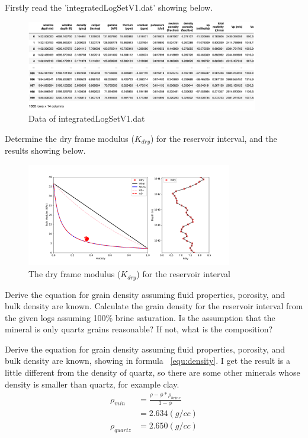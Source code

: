 \begin{solution}

    Firstly read the 'integratedLogSetV1.dat' showing below.
    \begin{figure}[H]
        \centering
        \includegraphics[width=0.9\textwidth]{figures/homework-1/p2-problem-0.jpg}
        \caption{Data of integratedLogSetV1.dat}
        \label{fig:logdata}
    \end{figure}
    Determine the dry frame modulus ($K_{dry}$) for the reservoir interval, and the results showing below.
    \begin{figure}[H]
        \centering
        \includegraphics[width=0.8\textwidth]{figures/homework-1/p2-problem-1.pdf}
        \caption{The dry frame modulus ($K_{dry}$) for the reservoir interval}
        \label{fig:kdry}
    \end{figure}
\end{solution}


\begin{problem}{2}
    Derive the equation for grain density assuming fluid properties, porosity, and bulk density are known. Calculate the grain density for the reservoir interval from the given logs assuming 100\% brine saturation. Is the assumption that the mineral is only quartz grains reasonable? If not, what is the composition?
\end{problem}

\begin{solution}

    Derive the equation for grain density assuming fluid properties, porosity, 
    and bulk density are known, showing in formula ~\ref{equ:density}. 
    I get the result is a little different from the density of quartz, 
    so there are some other minerals whose density is smaller than quartz, for example clay.
    \begin{align}
        \rho_{min} &  = \frac{\rho - \phi * \rho_{brine}}{1-\phi}  \\
        &  = 2.634 (g/cc) \\
        \rho_{quartz} &  = 2.650 (g/cc)
        \label{equ:density}
    \end{align}
\end{solution}

